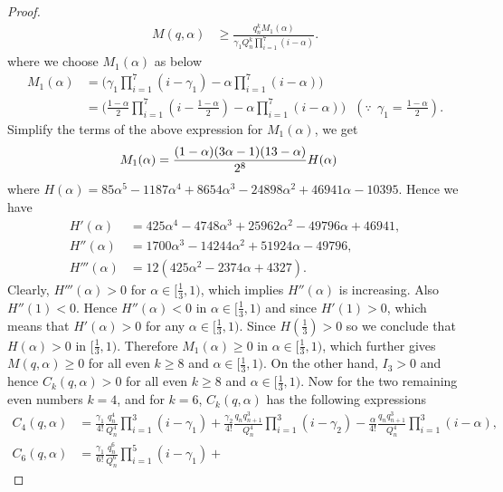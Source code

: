 \documentclass[12pt]{amsart}
\theoremstyle{definition}
\theoremstyle{plain}
\theoremstyle{definition}
\numberwithin{equation}{section}
\begin{document}
\begin{proof}
\begin{align*}
M(q,\alpha)& \geq\frac{q_{n}^{k}M_{1}(\alpha)}{\gamma_{1}Q_{n}^{k}\displaystyle\prod_{i=1}^{7}(i-\alpha)}.
\end{align*}
where we choose $M_{1}(\alpha)$ as below
\begin{align*}
M_{1}(\alpha)&=\Big(\gamma_{1}\displaystyle\prod_{i=1}^{7}(i-\gamma_{1})-\alpha\displaystyle\prod_{i=1}^{7}(i-\alpha)\Big)\\
&=\Big(\frac{1-\alpha}{2}\displaystyle\prod_{i=1}^{7}(i-\frac{1-\alpha}{2})-\alpha\displaystyle\prod_{i=1}^{7}(i-\alpha)\Big)~~~(\because~~ \gamma_{1}=\frac{1-\alpha}{2}).
\end{align*}Simplify the terms of the above expression for $M_{1}(\alpha)$, we get
\begin{align}{\label{M-H-eq}}
M_{1}(\alpha)&=\frac{(1-\alpha)(3\alpha-1)(13-\alpha)}{2^{8}}H(\alpha)
\end{align}
where $H(\alpha)=85\alpha^{5}-1187\alpha^{4}+8654\alpha^{3}-24898\alpha^{2}+46941\alpha-10395$. Hence we have
\begin{align*}
H'(\alpha)&=425\alpha^{4}-4748\alpha^{3}+25962\alpha^{2}-49796\alpha+46941,\\
H''(\alpha)&=1700\alpha^{3}-14244\alpha^{2}+51924\alpha-49796,\\
H'''(\alpha)&=12(425\alpha^{2}-2374\alpha+4327).
\end{align*}
Clearly, $H'''(\alpha)>0$ for $\alpha\in[\frac{1}{3}, 1)$, which implies $H''(\alpha)$ is increasing. Also $H''(1)<0$. Hence $H''(\alpha)<0$ in $\alpha\in[\frac{1}{3}, 1)$ and since $H'(1)>0$, which means that $H'(\alpha)>0$ for any $\alpha\in[\frac{1}{3},1)$. Since $H(\frac{1}{3})>0$ so we conclude that $H(\alpha)>0$ in $[\frac{1}{3}, 1)$. Therefore $M_{1}(\alpha)\geq0$ in $\alpha\in[\frac{1}{3},1)$, which further gives $M(q,\alpha)\geq0$ for all even $k\geq8$ and $\alpha\in[\frac{1}{3},1)$. On the other hand, $I_{3}>0$ and hence  $C_{k}(q,\alpha)>0$ for all even $k\geq8$ and $\alpha\in[\frac{1}{3},1)$. Now for the two remaining even numbers $k=4$, and for $k=6$, $C_{k}(q,\alpha)$ has the following expressions
\begin{align*}
C_{4}(q,\alpha)&=\frac{\gamma_{1}}{4!}\frac{q_{n}^{4}}{Q_{n}^{4}}\displaystyle\prod_{i=1}^{3}(i-\gamma_{1})+
\frac{\gamma_{2}}{4!}\frac{q_{n}q_{n+1}^{3}}{Q_{n}^{4}}\displaystyle\prod_{i=1}^{3}
(i-\gamma_{2})-\frac{\alpha}{4!}\frac{q_{n}q_{n+1}^{3}}{Q_{n}^{4}}\displaystyle\prod_{i=1}^{3}(i-\alpha),\\
C_{6}(q,\alpha)&=\frac{\gamma_{1}}{6!}\frac{q_{n}^{6}}{Q_{n}^{6}}\displaystyle\prod_{i=1}^{5}(i-\gamma_{1})+

\end{align*}
\end{proof}
\end{document}
